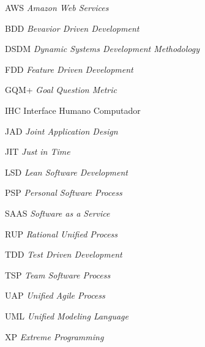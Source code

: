 
\listoffigures*
\cleardoublepage


\listoftables*
\cleardoublepage

\begin{siglas} %
  \item[AWS] \textit{Amazon Web Services}
  \item[BDD] \textit{Bevavior Driven Development}
  \item[DSDM] \textit{Dynamic Systems Development Methodology}
  \item[FDD] \textit{Feature Driven Development}
  \item[GQM+] \textit{Goal Question Metric}
  \item[IHC] Interface Humano Computador
  \item[JAD] \textit{Joint Application Design}
  \item[JIT] \textit{Just in Time}
  \item[LSD] \textit{Lean Software Development}
  \item[PSP] \textit{Personal Software Process}
  \item[SAAS] \textit{Software as a Service}
  \item[RUP] \textit{Rational Unified Process}
  \item[TDD] \textit{Test Driven Development}
  \item[TSP] \textit{Team Software Process}
  \item[UAP] \textit{Unified Agile Process} 
  \item[UML] \textit{Unified Modeling Language}
  \item[XP] \textit{Extreme Programming}
\end{siglas}


 
\tableofcontents*
\cleardoublepage


